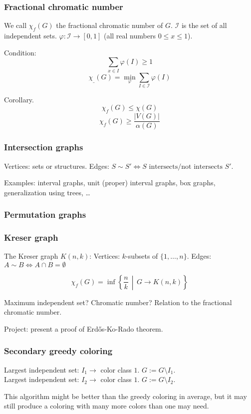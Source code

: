 \documentclass[12pt,a4paper]{article}
\begin{document}
\subsubsection{Fractional chromatic number}
We call \(\chi_f(G)\) the fractional chromatic number of \(G\). \(\mathcal{I}\)
is the set of all independent sets. \(\varphi: \mathcal{I} \to [0, 1]\) (all
real numbers \(0 \leq x \leq 1\)).

Condition: \[\sum_{x \in I} \varphi(I) \geq 1\]
\[\chi_{\_}(G) = \min_\varphi \sum_{I \in \mathcal{I}} \varphi(I)\]

Corollary. \[\chi_f(G) \leq \chi(G)\]
\[\chi_f(G) \geq \frac{|V(G)|}{\alpha(G)}\]

\subsubsection{Intersection graphs}
Vertices: sets or structures.
Edges: \(S \sim S' \Leftrightarrow S \text{ intersects/not intersects } S'\).

Examples: interval graphs, unit (proper) interval graphs, box graphs,
generalization using trees, …

\subsubsection{Permutation graphs}
\subsubsection{Kreser graph}
The Kreser graph \(K(n, k)\):
Vertices: \(k\)-subsets of \(\{1, \dots, n\}\).
Edges: \(A \sim B \Leftrightarrow A \cap B = \emptyset\)

\[\chi_f(G) = \inf\left\{ \frac{n}{k} \,\middle|\, G \to K(n, k)\right\}\]

Maximum independent set? Chromatic number? Relation to the fractional chromatic
number.

Project: present a proof of Erdős-Ko-Rado theorem.

\subsubsection{Secondary greedy coloring}
Largest independent set: \(I_1 \to\) color class \(1\).
\(G := G \setminus I_1\).\\
Largest independent set: \(I_2 \to\) color class \(1\).
\(G := G \setminus I_2\).

This algorithm might be better than the greedy coloring in average, but it may
still produce a coloring with many more colors than one may need.
\end{document}
